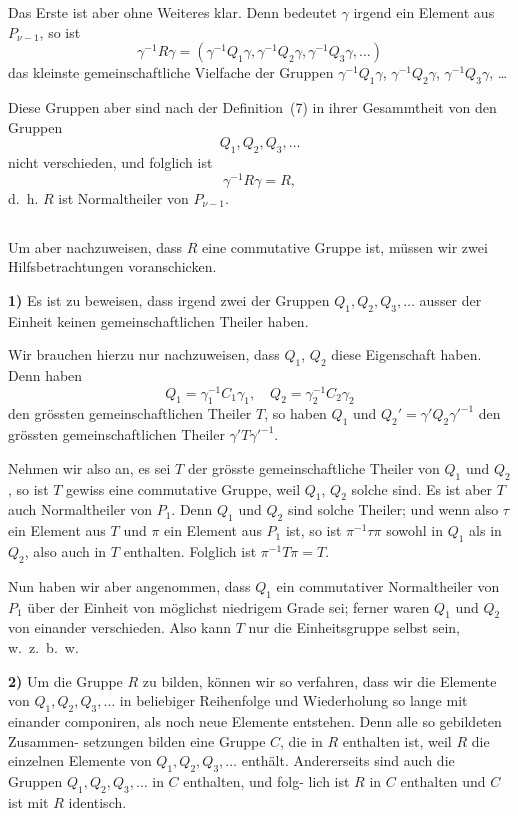 \documentclass[12pt,a4paper]{article}
\theoremstyle{plain}
\theoremstyle{definition}
\theoremstyle{remark}
\begin{document}
Das Erste ist aber ohne Weiteres klar. Denn bedeutet $\gamma$
irgend ein Element aus $P_{\nu-1}$, so ist
\[
\gamma^{-1} R \gamma = (\gamma^{-1} Q_1 \gamma, \gamma^{-1} Q_2 \gamma, \gamma^{-1} Q_3 \gamma, \ldots)
\]
das kleinste gemeinschaftliche Vielfache der Gruppen
$\gamma^{-1} Q_1 \gamma$, $\gamma^{-1} Q_2 \gamma$, $\gamma^{-1} Q_3 \gamma$, \ldots

Diese Gruppen aber sind nach der Definition~(7) in ihrer
Gesammtheit von den Gruppen
\[
Q_1, Q_2, Q_3, \ldots
\]
nicht verschieden, und folglich ist
\[
\gamma^{-1} R \gamma = R,
\]
d.~h. $R$ ist Normaltheiler von $P_{\nu-1}$.

\subsection*{}

Um aber nachzuweisen, dass $R$ eine commutative Gruppe
ist, müssen wir zwei Hilfsbetrachtungen voranschicken.

\textbf{1)} Es ist zu beweisen, dass irgend zwei der Gruppen
$Q_1, Q_2, Q_3, \ldots$ ausser der Einheit keinen gemeinschaftlichen
Theiler haben.

Wir brauchen hierzu nur nachzuweisen, dass $Q_1$, $Q_2$ diese
Eigenschaft haben. Denn haben
\[
Q_1 = \gamma_1^{-1} C_1 \gamma_1, \quad Q_2 = \gamma_2^{-1} C_2 \gamma_2
\]
den grössten gemeinschaftlichen Theiler $T$, so haben $Q_1$ und
$Q_2' = \gamma' Q_2 \gamma'^{-1}$ den grössten gemeinschaftlichen Theiler $\gamma' T \gamma'^{-1}$.

Nehmen wir also an, es sei $T$ der grösste gemeinschaftliche
Theiler von $Q_1$ und $Q_2$, so ist $T$ gewiss eine commutative Gruppe,
weil $Q_1$, $Q_2$ solche sind. Es ist aber $T$ auch Normaltheiler
von $P_1$. Denn $Q_1$ und $Q_2$ sind solche Theiler; und wenn also $\tau$
ein Element aus $T$ und $\pi$ ein Element aus $P_1$ ist, so ist $\pi^{-1} \tau \pi$
sowohl in $Q_1$ als in $Q_2$, also auch in $T$ enthalten. Folglich ist
$\pi^{-1} T \pi = T$.

Nun haben wir aber angenommen, dass $Q_1$ ein commutativer
Normaltheiler von $P_1$ über der Einheit von möglichst niedrigem
Grade sei; ferner waren $Q_1$ und $Q_2$ von einander verschieden.
Also kann $T$ nur die Einheitsgruppe selbst sein, w.~z.~b.~w.

\textbf{2)} Um die Gruppe $R$ zu bilden, können wir so verfahren,
dass wir die Elemente von $Q_1, Q_2, Q_3, \ldots$ in beliebiger Reihenfolge
und Wiederholung so lange mit einander componiren, als noch
neue Elemente entstehen. Denn alle so gebildeten Zusammen-
setzungen bilden eine Gruppe $C$, die in $R$ enthalten ist, weil $R$
die einzelnen Elemente von $Q_1, Q_2, Q_3, \ldots$ enthält. Andererseits
sind auch die Gruppen $Q_1, Q_2, Q_3, \ldots$ in $C$ enthalten, und folg-
lich ist $R$ in $C$ enthalten und $C$ ist mit $R$ identisch.
\end{document}
